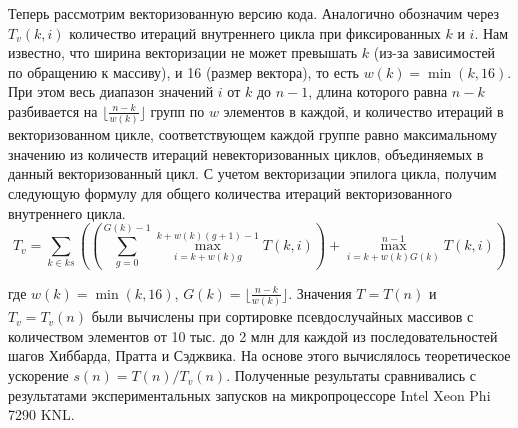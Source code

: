 Теперь рассмотрим векторизованную версию кода. 
Аналогично обозначим через $T_v(k,i)$ количество итераций внутреннего цикла при фиксированных $k$ и $i$. 
Нам известно, что ширина векторизации не может превышать $k$ (из-за зависимостей по обращению к массиву), и 16 (размер вектора), то есть $w(k) = \min(k, 16)$. 
При этом весь диапазон значений $i$ от $k$ до $n - 1$, длина которого равна $n - k$ разбивается на $\lfloor \frac{n - k}{w(k)} \rfloor$ групп по $w$ элементов в каждой, и количество итераций в векторизованном цикле, соответствующем каждой группе равно максимальному значению из количеств итераций невекторизованных циклов, объединяемых в данный векторизованный цикл. 
С учетом векторизации эпилога цикла\label{term:epilog2}, получим следующую формулу для общего количества итераций векторизованного внутреннего цикла.
\begin{equation}
	T_v = \sum_{k \in ks}
	{
		\left(
			\left(
				\sum_{g = 0}^{G(k) - 1}{\max_{i = k + w(k)g}^{k + w(k)(g + 1) - 1}{T(k, i)}}
			\right)
			+ \max_{i = k + w(k)G(k)}^{n - 1}{T(k, i)}
		\right)
	}
\end{equation}

где $w(k) = \min(k, 16)$, $G(k) = \lfloor \frac{n - k}{w(k)} \rfloor$. 
Значения $T = T(n)$ и $T_v = T_v(n)$ были вычислены при сортировке псевдослучайных массивов с количеством элементов от 10 тыс. до 2 млн для каждой из последовательностей шагов Хиббарда, Пратта и Сэджвика. 
На основе этого вычислялось теоретическое ускорение $s(n) = T(n)/T_v(n)$.
Полученные результаты сравнивались с результатами экспериментальных запусков на микропроцессоре Intel Xeon Phi 7290 KNL\label{abbr:knl14}.


